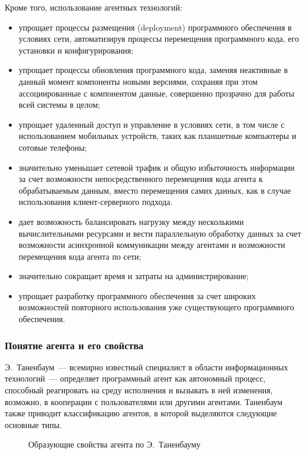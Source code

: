 Кроме того, использование агентных технологий:
\begin{itemize}
\item упрощает процессы размещения (deployment) программного обеспечения в условиях сети, автоматизируя процессы перемещения программного кода, его установки и конфигурирования;
\item упрощает процессы обновления программного кода, заменяя неактивные в данный момент компоненты новыми версиями, сохраняя при этом ассоциированные с компонентом данные, совершенно прозрачно для работы всей системы в целом;
\item упрощает удаленный доступ и управление в условиях сети, в том числе с использованием мобильных устройств, таких как планшетные компьютеры и сотовые телефоны;
\item значительно уменьшает сетевой трафик и общую избыточность информации за счет возможности непосредственного перемещения кода агента к обрабатываемым данным, вместо перемещения самих данных, как в случае использования клиент-серверного подхода.
\item дает возможность балансировать нагрузку между несколькими вычислительными ресурсами и вести параллельную обработку данных за счет возможности асинхронной коммуникации между агентами и возможности перемещения кода агента по сети;
\item значительно сокращает время и затраты на администрирование;
\item упрощает разработку программного обеспечения за счет широких возможностей повторного использования уже существующего программного обеспечения.
\end{itemize}

\subsubsection{Понятие агента и его свойства}
Э.~Таненбаум~--- всемирно известный специалист в области информационных технологий~--- определяет программный агент как автономный процесс, способный реагировать на среду исполнения и вызывать в ней изменения, возможно, в кооперации с пользователями или другими агентами. Таненбаум также приводит классификацию агентов, в которой выделяются следующие основные типы.
\begin{figure}[h]
\caption{Образующие свойства агента по Э.~Таненбауму}
\label{1:tanenbaum-agent}
\end{figure}

